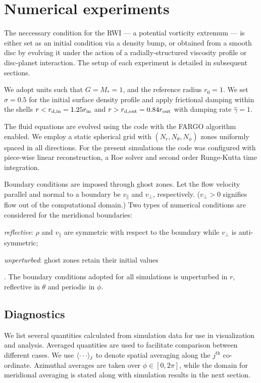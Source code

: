 \section{Numerical experiments}
The neccessary condition for the RWI --- a potential vorticity 
extremum --- is either set as an initial condition via a density bump, 
or obtained from a smooth disc by evolving it under the action of a
radially-structured viscosity profile or disc-planet interaction. The
setup of each experiment is detailed in subsequent sections.   

We adopt units such that $G=M_*=1$, and the reference radius $r_0=1$.    
We set $\sigma=0.5$ for the initial surface density profile and apply 
frictional damping within the shells $r<r_\mathrm{d,in} = 1.25r_\mathrm{in}$
and $r>r_\mathrm{d,out}=0.84r_\mathrm{out}$ with damping rate $\hat{\gamma}=1$. 

The fluid equations are evolved using the \pluto code \citep{mignone07} with 
the FARGO algorithm enabled\citep{mignone12}. We employ a static
spherical grid with $(N_r, N_\theta, N_\phi)$ zones uniformly spaced
in all directions. For the present simulations the code was configured
with piece-wise linear reconstruction, a Roe solver and second order
Runge-Kutta time integration.   

Boundary conditions are imposed through ghost zones.   
Let the flow velocity parallel and normal to a boundary be
$v_\parallel$ and $v_\perp$, respectively. ($v_\perp>0$ signifies flow
out of the computational domain.) Two types of numerical 
conditions are considered for the meridional boundaries:
\begin{inparaenum}[(a)]
\item \emph{reflective}: $\rho$ and $v_\parallel$ are symmetric with
  respect to the boundary while $v_\perp$ is anti-symmetric;  
\item \emph{unperturbed}: ghost zones retain their initial values
\end{inparaenum}.
The boundary conditions adopted for all simulations is unperturbed in
$r$, reflective in $\theta$ and periodic in $\phi$. 


\subsection{Diagnostics}
We list several quantities calculated from
simulation data for use in visualization and analysis. 
Averaged quantities are used to facilitate  
comparison between different cases. We use $\avg{\cdots}_j$ 
to denote spatial averaging along the $j^\mathrm{th}$ co-ordinate. 
Azimuthal averages are taken over $\phi\in[0,2\pi]$, while the domain
for meridional averaging is stated along with simulation results in
the next section. %

